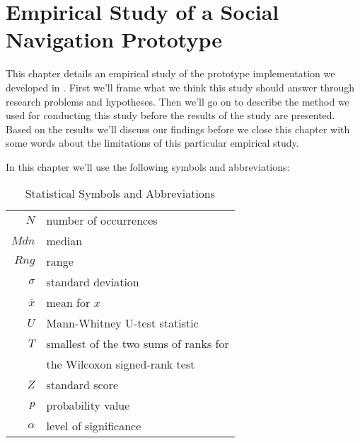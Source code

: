 \chapter{Empirical Study of a Social Navigation Prototype}
\label{chapter:empirical}

This chapter details an empirical study of the prototype implementation we
developed in . First we'll frame what we think this
study should answer through research problems and hypotheses. Then we'll go on
to describe the method we used for conducting this study before the results of
the study are presented. Based on the results we'll discuss our findings
before we close this chapter with some words about the limitations of this
particular empirical study.

In this chapter we'll use the following symbols and abbreviations:

\begin{table}[!h]
  \begin{tabular}{rl}

  $N$ & number of occurrences \\
  $Mdn$ & median \\
  $Rng$ & range \\
  $\sigma$ & standard deviation \\
  $\overline{x}$ & mean for $x$ \\
  $U$ & Mann-Whitney U-test statistic \\
  $T$ & smallest of the two sums of ranks for \\
      & the Wilcoxon signed-rank test \\
  $Z$ & standard score \\
  $p$ & probability value \\
  $\alpha$ & level of significance \\

  \end{tabular}

  \caption[Statistical Symbols]{Statistical Symbols and Abbreviations}
  \label{table:statistical.symbols}
\end{table}






